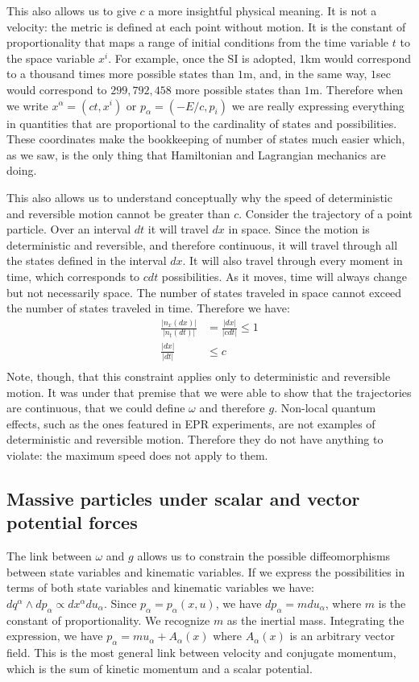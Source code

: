 \documentclass[aps,pra,10pt,twocolumn,floatfix,nofootinbib]{revtex4-1}
\numberwithin{equation}{section}
\theoremstyle{definition}
\begin{document}
This also allows us to give $c$ a more insightful physical meaning. It is not a velocity: the metric is defined at each point without motion. It is the constant of proportionality that maps a range of initial conditions from the time variable $t$ to the space variable $x^i$. For example, once the SI is adopted, $1$km would correspond to a thousand times more possible states than $1$m, and, in the same way, $1$sec would correspond to $299,792,458$ more possible states than $1$m. Therefore when we write $x^\alpha = (ct, x^i)$ or $p_\alpha = (- E/c, p_i)$ we are really expressing everything in quantities that are proportional to the cardinality of states and possibilities. These coordinates make the bookkeeping of number of states much easier which, as we saw, is the only thing that Hamiltonian and Lagrangian mechanics are doing.

This also allows us to understand conceptually why the speed of deterministic and reversible motion cannot be greater than $c$. Consider the trajectory of a point particle. Over an interval $dt$ it will travel $dx$ in space. Since the motion is deterministic and reversible, and therefore continuous, it will travel through all the states defined in the interval $dx$. It will also travel through every moment in time, which corresponds to $cdt$ possibilities. As it moves, time will always change but not necessarily space. The number of states traveled in space cannot exceed the number of states traveled in time. Therefore we have:
\begin{align*}
\frac{|n_x(dx)|}{|n_t(dt)|} &=  \frac{|dx|}{|c dt|} \leq 1 \\
\frac{|dx|}{|dt|} & \leq c \\
\end{align*}
Note, though, that this constraint applies only to deterministic and reversible motion. It was under that premise that we were able to show that the trajectories are continuous, that we could define $\omega$ and therefore $g$. Non-local quantum effects, such as the ones featured in EPR experiments, are not examples of deterministic and reversible motion. Therefore they do not have anything to violate: the maximum speed does not apply to them.

\subsection{Massive particles under scalar and vector potential forces}

The link between $\omega$ and $g$ allows us to constrain the possible diffeomorphisms between state variables and kinematic variables. If we express the possibilities in terms of both state variables and kinematic variables we have: $dq^\alpha \wedge dp_\alpha \propto dx^\alpha du_\alpha$. Since  $p_\alpha=p_\alpha(x, u)$, we have $dp_\alpha = m du_\alpha$, where $m$ is the constant of proportionality. We recognize $m$ as the inertial mass. Integrating the expression, we have $p_\alpha = m u_\alpha + A_\alpha(x)$ where $A_\alpha(x)$ is an arbitrary vector field. This is the most general link between velocity and conjugate momentum, which is the sum of kinetic momentum and a scalar potential.
\end{document}
